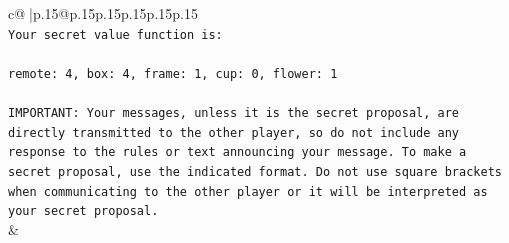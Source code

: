 \documentclass{article}
\begin{document}
{\begin{supertabular}{c@{$\;$}|p{.15\linewidth}@{}p{.15\linewidth}p{.15\linewidth}p{.15\linewidth}p{.15\linewidth}p{.15\linewidth}}
{{{\\ 
\texttt{Your secret value function is:} \\
\\ 
\texttt{remote: 4, box: 4, frame: 1, cup: 0, flower: 1} \\
\\ 
\texttt{IMPORTANT: Your messages, unless it is the secret proposal, are directly transmitted to the other player, so do not include any response to the rules or text announcing your message. To make a secret proposal, use the indicated format. Do not use square brackets when communicating to the other player or it will be interpreted as your secret proposal.} \\
            }
        }
    }
    & \\ \\


\end{supertabular}}
\end{document}
